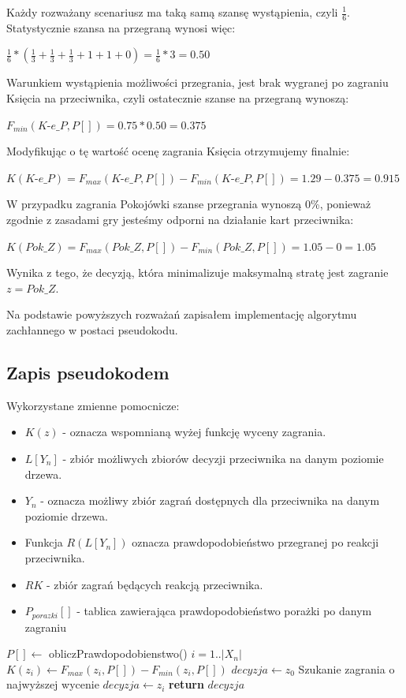 Każdy rozważany scenariusz ma taką samą szansę wystąpienia, czyli $\frac{1}{6}$. Statystycznie szansa na przegraną wynosi więc:
\begin{center}
 $\frac{1}{6} * (\frac{1}{3} + \frac{1}{3} + \frac{1}{3} + 1 + 1 + 0) = \frac{1}{6} * 3 = 0.50 $
\end{center}
Warunkiem wystąpienia możliwości przegrania, jest brak wygranej po zagraniu Księcia na przeciwnika, czyli ostatecznie szanse na przegraną wynoszą:
\begin{center}
	$F_{min}(\textit{K-e\_P}, P[]) = 0.75 * 0.50 = 0.375$
\end{center}
Modyfikując o tę wartość ocenę zagrania Księcia otrzymujemy finalnie:
\begin{center}
	$K(\textit{K-e\_P}) =  F_{max}(\textit{K-e\_P}, P[]) - F_{min}(\textit{K-e\_P}, P[]) = 1.29 - 0.375 = 0.915$
\end{center} 
W przypadku zagrania Pokojówki szanse przegrania wynoszą 0\%, ponieważ zgodnie z zasadami gry jesteśmy odporni na działanie kart przeciwnika:
\begin{center}
	$K(Pok\_Z) =  F_{max}(Pok\_Z, P[]) - F_{min}(Pok\_Z, P[]) = 1.05 - 0 = 1.05$
\end{center} 
Wynika z tego, że decyzją, która minimalizuje maksymalną stratę jest zagranie $z = Pok\_Z$.

Na podstawie powyższych rozważań zapisałem implementację algorytmu zachłannego w postaci pseudokodu.
\subsection{Zapis pseudokodem}
Wykorzystane zmienne pomocnicze:
\begin{itemize}
	\item $K(z)$ - oznacza wspomnianą wyżej funkcję wyceny zagrania. 
	\item $L[Y_n]$ - zbiór możliwych zbiorów decyzji przeciwnika na danym poziomie drzewa.	
	\item $Y_n$ - oznacza możliwy zbiór zagrań dostępnych dla przeciwnika na danym poziomie drzewa.
	\item Funkcja $R(L[Y_n])$ oznacza prawdopodobieństwo przegranej po reakcji przeciwnika.
	\item $RK$ - zbiór zagrań będących reakcją przeciwnika.
	\item $P_{porazki}[]$ - tablica zawierająca prawdopodobieństwo porażki po danym zagraniu
\end{itemize}

\begin{algorithmic}[1]
	\State $P[] \gets$ obliczPrawdopodobienstwo()
		 \Comment $i=1..|X_n|$
			\State $K(z_i) \gets F_{max}(z_i, P[]) - F_{min}(z_i, P[])$
		\EndFor		
		\State $ decyzja \gets z_0$ \Comment Szukanie zagrania o najwyższej wycenie
				\State $decyzja \gets z_i$
			\EndIf
		\EndFor		
		\State \textbf{return} $decyzja$
	\EndFunction
\end{algorithmic}

